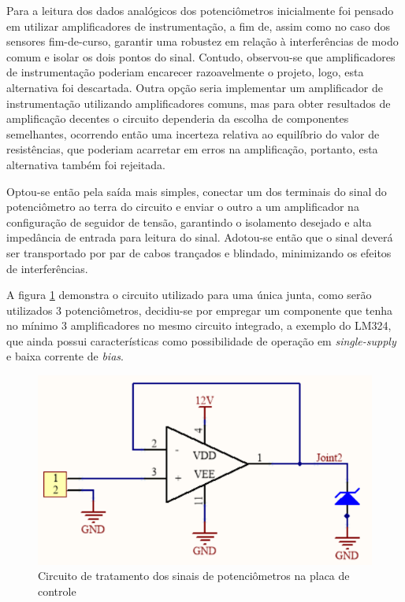 Para a leitura dos dados analógicos dos potenciômetros
inicialmente foi pensado em utilizar amplificadores de instrumentação,
a fim de, assim como no caso dos sensores fim-de-curso, garantir uma 
robustez em relação à interferências de modo comum e isolar os dois 
pontos do sinal. Contudo, observou-se que amplificadores de 
instrumentação poderiam encarecer razoavelmente o projeto, logo, esta alternativa foi 
descartada.
Outra opção seria implementar um amplificador de instrumentação 
utilizando amplificadores comuns, mas para obter resultados de 
amplificação decentes o circuito dependeria da escolha de componentes
semelhantes, ocorrendo então uma incerteza relativa ao equilíbrio do 
valor de resistências, que poderiam acarretar em erros na amplificação, 
portanto, esta alternativa também foi rejeitada.

Optou-se então pela saída mais simples, conectar um dos terminais do 
sinal do potenciômetro ao terra do circuito e enviar o outro a um 
amplificador na configuração de seguidor de tensão, garantindo o 
isolamento desejado e alta impedância de entrada para leitura do sinal.
Adotou-se então que o sinal deverá ser transportado por par de cabos
trançados e blindado, minimizando os efeitos de interferências.

A figura \ref{fig:MainPCB-Pot} demonstra o circuito utilizado para uma 
única junta, como serão utilizados 3 potenciômetros, decidiu-se por 
empregar um componente que tenha no mínimo 3 amplificadores no mesmo 
circuito integrado, a exemplo do LM324, que ainda possui características
como possibilidade de operação em \textit{single-supply} e baixa corrente
de \textit{bias}.

\begin{figure}[h]
    \caption{Circuito de tratamento dos sinais de potenciômetros na placa de controle}    
    \begin{centering}

        \includegraphics[width=0.6\columnwidth]{images/pcbs/MainPCB-Pot.png}
    
    \par\end{centering}

    \label{fig:MainPCB-Pot}
\end{figure}

